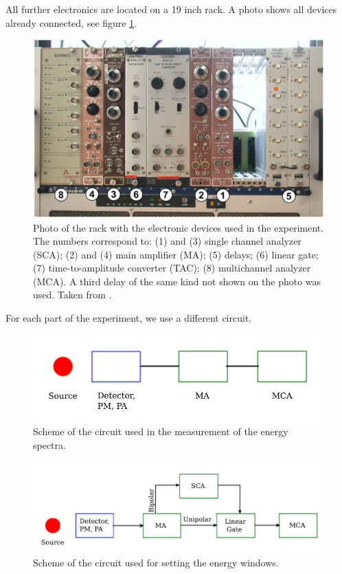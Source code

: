 All further electronics are located on a 19 inch rack. A photo shows all devices already 
connected, see figure \ref{fig:rack}. 

\begin{figure}[H]
    \centering
    \includegraphics[width=0.8\linewidth]{figures/rack_anleitung.jpg}
    \caption{
        Photo of the rack with the electronic devices used in the experiment.
        The numbers correspond to: 
        (1) and (3) single channel analyzer (SCA);
        (2) and (4) main amplifier (MA);
        (5) delays;
        (6) linear gate;
        (7) time-to-amplitude converter (TAC);
        (8) multichannel analyzer (MCA).
        A third delay of the same kind not shown on the photo was used. 
        Taken from \cite{ver}.
        }
    \label{fig:rack}
\end{figure}

For each part of the experiment, we use a different circuit. 


\begin{figure}[h]
    \centering
    \includegraphics[width=0.8\linewidth]{figures/circuit1.pdf}
    \caption{
        Scheme of the circuit used in the measurement of the energy spectra. 
        }
    \label{fig:circuit1}
\end{figure}

\begin{figure}[h]
    \centering
    \includegraphics[width=0.8\linewidth]{figures/circuit2.pdf}
    \caption{
        Scheme of the circuit used for setting the energy windows. 
        }
    \label{fig:circuit2}
\end{figure}
